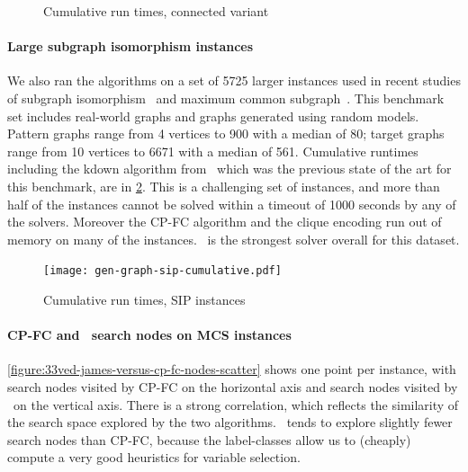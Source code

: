 \documentclass[letterpaper]{article}
\newcommand{\McSplit}{\textproc{McSplit}}
\begin{document}
\begin{figure}[ht]
    \centering

    \caption{Cumulative run times, connected variant}
    \label{figure:mcs-connected-cumulative}
\end{figure}

\paragraph{Large subgraph isomorphism instances} We also ran the algorithms on
a set of 5725 larger instances used in recent studies of subgraph
isomorphism~\cite{thelionpaper} and maximum common
subgraph~\cite{UpcomingAAAIPaper}.  This benchmark set includes real-world
graphs and graphs generated using random models.  Pattern graphs range from 4
vertices to 900 with a median of 80; target graphs range from 10 vertices to
6671 with a median of 561.  Cumulative runtimes including the kdown algorithm
from~\cite{UpcomingAAAIPaper} which was the previous state of the art for this
benchmark, are in \cref{figure:sip-cumulative}.  This is a challenging set of
instances, and more than half of the instances cannot be solved within a
timeout of 1000 seconds by any of the solvers. Moreover the CP-FC algorithm and
the clique encoding run out of memory on many of the instances.  \McSplit\
is the strongest solver overall for this dataset.

\begin{figure}[h]
    \centering
    \texttt{[image: gen-graph-sip-cumulative.pdf]}
    \caption{Cumulative run times, SIP instances}\label{figure:sip-cumulative}
\end{figure}

\paragraph{CP-FC and \McSplit\ search nodes on MCS instances}
\cref{figure:33ved-james-versus-cp-fc-nodes-scatter} shows one point per instance,
with search nodes visited by CP-FC on the horizontal axis and search nodes visited
by \McSplit\ on the vertical axis.  There is a strong correlation, which reflects
the similarity of the search space explored by the two algorithms.  \McSplit\
tends to explore slightly fewer search nodes than CP-FC, because the label-classes
allow us to (cheaply) compute a very good heuristics for variable selection.
\end{document}
